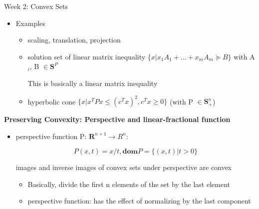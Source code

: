 \documentclass{article}
\begin{document}
\begin{homeworkProblemName}{{\LARGE Week 2: Convex Sets}}
\begin{problemAnswer}
{\begin{itemize}
\begin{itemize}
          \[S \subseteq \bm{R^n} \text{ convex } \implies f(S) = \{f(x) | x \in S\} \text{
              convex}\]

        \item The inverse image f$^{-1}$(C) of a convex set under f is convex

          \[C \subseteq \bm{R^m} \text{ convex } \implies f^{-1}(C) = \{x \in \bm{R^n} |
            f(x) \in C\} \text{ convex}\]

          This is the case even when the forward function isn't a strict
          function but more of a relation (many - one). We can still call an
          inverse on the set
        \end{itemize}

      \item Examples
        \begin{itemize}
        \item scaling, translation, projection
        \item solution set of linear matrix inequality $\{x | x_1A_1 + ... +
          x_mA_m \succeq B\}$ with A$_i$, B $\in \bm{S}^P$

          This is basically a linear matrix inequality
        \item hyperbolic cone $\{x | x^TPx \leq(c^Tx)^2, c^Tx \geq 0\}$ (with P $\in
          \bm{S}^n_+$)

      \end{itemize}
      \end{itemize}
    }\end{problemAnswer}

  \vspace{0.2 cm} \textbf{\large Preserving Convexity: Perspective and
    linear-fractional function}

  \begin{problemAnswer}{
      \begin{itemize}
      \item perspective function P: $\bm{R}^{n+1} \rightarrow R^n$:

        \[P(x,t) = x/t, \textbf{dom} P = \{(x, t) | t > 0\} \]

        images and inverse images of convex sets under perspective are convex

        \begin{itemize}
        \item Basically, divide the first n elements of the set by the last
          element
        \item perspective function: has the effect of normalizing by the last
          component
        \end{itemize}


\end{itemize}}
\end{problemAnswer}
\end{homeworkProblemName}
\end{document}
